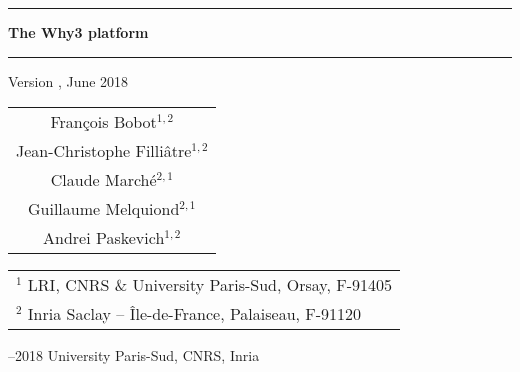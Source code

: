 \documentclass[a4paper,11pt,twoside,openright]{memoir}
\begin{document}
\sloppy

\thispagestyle{empty}

\begin{center}

\rule\textwidth{0.8mm}

\vfill

{
\fontsize{40}{40pt}\selectfont
\bfseries\sffamily The Why3 platform}

\vfill

\rule\textwidth{0.8mm}

\vfill


\begin{LARGE}
  Version \whyversion{}, June 2018
\end{LARGE}

\vfill

\begin{Large}
  \begin{tabular}{c}
  Fran\c{c}ois Bobot$^{1,2}$ \\
  Jean-Christophe Filli\^atre$^{1,2}$  \\
  Claude March\'e$^{2,1}$ \\
  Guillaume Melquiond$^{2,1}$\\
  Andrei Paskevich$^{1,2}$
\end{tabular}
\end{Large}
\vfill

\begin{flushleft}

\begin{tabular}{l}
$^1$ LRI, CNRS \& University Paris-Sud, Orsay, F-91405 \\
$^2$ Inria Saclay -- \^Ile-de-France, Palaiseau, F-91120
\end{tabular}

\bigskip

--2018 University Paris-Sud, CNRS, Inria



\end{flushleft}
\end{center}
\end{document}
